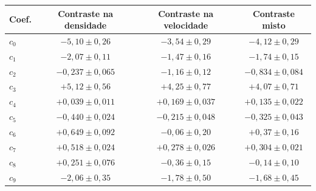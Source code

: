 \begin{tabular}{lccc}
\hline
Coef. & Contraste na densidade & Contraste na velocidade & Contraste misto \\
\hline
$c_{0}$ & $-5{,}10\pm0{,}26$ & $-3{,}54\pm0{,}29$ & $-4{,}12\pm0{,}29$ \\
$c_{1}$ & $-2{,}07\pm0{,}11$ & $-1{,}47\pm0{,}16$ & $-1{,}74\pm0{,}15$ \\
$c_{2}$ & $-0{,}237\pm0{,}065$ & $-1{,}16\pm0{,}12$ & $-0{,}834\pm0{,}084$ \\
$c_{3}$ & $+5{,}12\pm0{,}56$ & $+4{,}25\pm0{,}77$ & $+4{,}07\pm0{,}71$ \\
$c_{4}$ & $+0{,}039\pm0{,}011$ & $+0{,}169\pm0{,}037$ & $+0{,}135\pm0{,}022$ \\
$c_{5}$ & $-0{,}440\pm0{,}024$ & $-0{,}215\pm0{,}048$ & $-0{,}325\pm0{,}043$ \\
$c_{6}$ & $+0{,}649\pm0{,}092$ & $-0{,}06\pm0{,}20$ & $+0{,}37\pm0{,}16$ \\
$c_{7}$ & $+0{,}518\pm0{,}024$ & $+0{,}278\pm0{,}026$ & $+0{,}304\pm0{,}021$ \\
$c_{8}$ & $+0{,}251\pm0{,}076$ & $-0{,}36\pm0{,}15$ & $-0{,}14\pm0{,}10$ \\
$c_{9}$ & $-2{,}06\pm0{,}35$ & $-1{,}78\pm0{,}50$ & $-1{,}68\pm0{,}45$ \\
\hline
\end{tabular}
